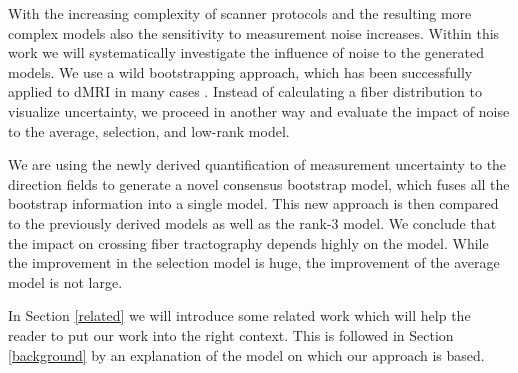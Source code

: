 With the increasing complexity of scanner protocols and the resulting more
complex models also the sensitivity to measurement noise increases. Within this work
we will systematically investigate the influence of noise to the generated
models. We use a wild bootstrapping approach, which has been
successfully applied to dMRI in many cases \cite{Jones:2008}. Instead of
calculating a fiber distribution to visualize uncertainty, we proceed in
another way and evaluate the impact of noise to the average, selection, and
low-rank model.

We are using the newly derived quantification of measurement uncertainty to the
direction fields to generate a novel consensus bootstrap
model, which fuses all the bootstrap information into a single model. This new
approach is then compared to the previously derived models as well as the
rank-$3$ model. We conclude that the
impact on crossing fiber tractography depends highly on the model. While the
improvement in the selection model is huge, the improvement of the
average model is not large. 

In Section \ref{related} we will introduce some related work which will help the
reader to put our work into the right context. This is followed in Section \ref{background} by an
explanation of the model on which our approach is based.
